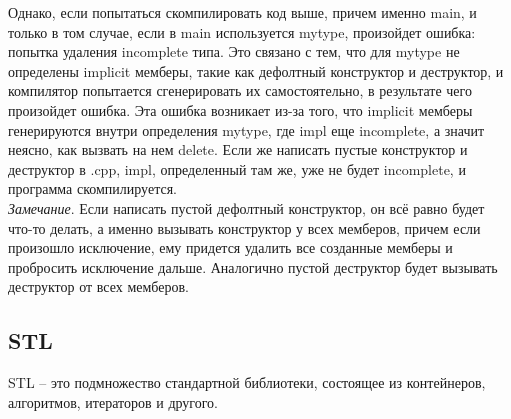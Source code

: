 \documentclass[12pt, a4paper]{article}
\begin{document}
	Однако, если попытаться скомпилировать код выше, причем именно main, и только в том случае, если в main используется mytype, произойдет ошибка: попытка удаления incomplete типа. Это связано с тем, что для mytype не определены implicit мемберы, такие как дефолтный конструктор и деструктор, и компилятор попытается сгенерировать их самостоятельно, в результате чего произойдет ошибка. Эта ошибка возникает из-за того, что implicit мемберы генерируются внутри определения mytype, где impl еще incomplete, а значит неясно, как вызвать на нем delete. Если же написать пустые конструктор и деструктор в .cpp, impl, определенный там же, уже не будет incomplete, и программа скомпилируется.\\
	\textit{Замечание}. Если написать пустой дефолтный конструктор, он всё равно будет что-то делать, а именно вызывать конструктор у всех мемберов, причем если произошло исключение, ему придется удалить все созданные мемберы и пробросить исключение дальше. Аналогично пустой деструктор будет вызывать деструктор от всех мемберов.
	\subsection{STL}
	STL -- это подмножество стандартной библиотеки, состоящее из контейнеров, алгоритмов, итераторов и другого.
	
\end{document}
